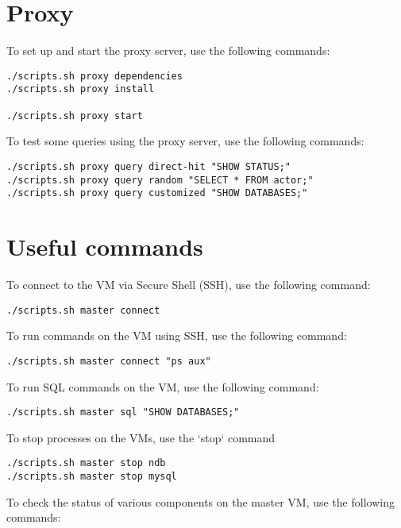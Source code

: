 \documentclass[11pt]{article}
\begin{document}
    \section{Proxy}
    To set up and start the proxy server, use the following commands:

    \begin{verbatim}
./scripts.sh proxy dependencies
./scripts.sh proxy install

./scripts.sh proxy start
    \end{verbatim}

    To test some queries using the proxy server, use the following commands:

    \begin{verbatim}
./scripts.sh proxy query direct-hit "SHOW STATUS;"
./scripts.sh proxy query random "SELECT * FROM actor;"
./scripts.sh proxy query customized "SHOW DATABASES;"
    \end{verbatim}


    \section{Useful commands}

    To connect to the VM via Secure Shell (SSH), use the following command:

    \begin{verbatim}
./scripts.sh master connect
    \end{verbatim}

    To run commands on the VM using SSH, use the following command:

    \begin{verbatim}
./scripts.sh master connect "ps aux"
    \end{verbatim}

    To run SQL commands on the VM, use the following command:

    \begin{verbatim}
./scripts.sh master sql "SHOW DATABASES;"
    \end{verbatim}

    To stop processes on the VMs, use the `stop` command

    \begin{verbatim}
./scripts.sh master stop ndb
./scripts.sh master stop mysql
    \end{verbatim}

    To check the status of various components on the master VM, use the following commands:
\end{document}
